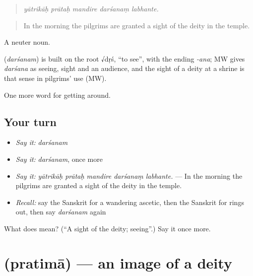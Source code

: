 \begin{quote}
    
\end{quote}

\begin{quote}
\emph{yātrikāḥ prātaḥ mandire darśanaṃ labhante.}
\end{quote}

\begin{quote}
In the morning the pilgrims are granted a sight of the deity in the temple.
\end{quote}

A neuter noun.

\begin{cousinweb}
\textbf{} (\emph{darśanam}) is built on the root √dṛś, \textquotedblleft{}to see\textquotedblright{}, with the ending \emph{-ana}; MW gives \emph{darśana} as seeing, sight and an audience, and the sight of a deity at a shrine is that sense in pilgrims' use (MW).
\end{cousinweb}

\begin{grammarlens}[title={What you've built}]
One more word for getting around.
\end{grammarlens}

\subsection*{Your turn}
\begin{itemize}
\raggedright
  \item \emph{Say it:} \emph{darśanam}
  \item \emph{Say it:} \emph{darśanam}, once more
  \item \emph{Say it:} \emph{yātrikāḥ prātaḥ mandire darśanaṃ labhante.} — In the morning the pilgrims are granted a sight of the deity in the temple.
  \item \emph{Recall:} say the Sanskrit for a wandering ascetic, then the Sanskrit for rings out, then say \emph{darśanam} again
\end{itemize}

\begin{tcolorbox}[breakable,colback=teal!4,colframe=teal!35!black,title={Before you move on}]
What does  mean? (\textquotedblleft{}A sight of the deity; seeing\textquotedblright{}.) Say it once more.
\end{tcolorbox}
\section[\texorpdfstring{\sk{प्रतिमा} (pratimā)}{प्रतिमा (pratimā)}]{ (pratimā) — an image of a deity}

